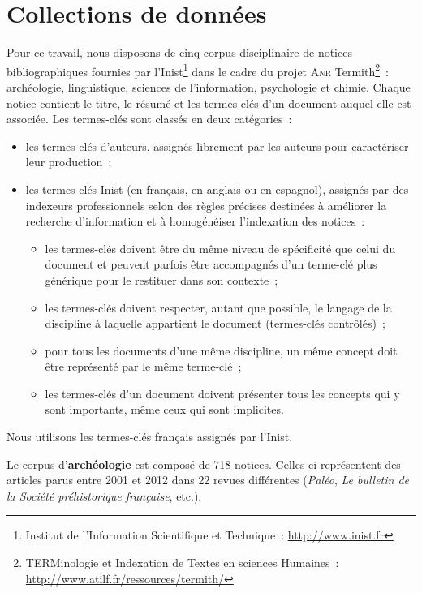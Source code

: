 \section{Collections de données}
\label{sec:presentation_des_donnees}
  Pour ce travail, nous disposons de cinq corpus disciplinaire de notices
  bibliographiques fournies par l'Inist\footnote{Institut de l'Information
  Scientifique et Technique~: \url{http://www.inist.fr}} dans le cadre du projet
  \textsc{Anr} Termith\footnote{TERMinologie et Indexation de Textes en sciences
  Humaines~: \url{http://www.atilf.fr/ressources/termith/}}~: archéologie,
  linguistique, sciences de l'information, psychologie et chimie. Chaque notice
  contient le titre, le résumé et les termes-clés d'un document auquel elle est
  associée. Les termes-clés sont classés en deux catégories~:
  \begin{itemize}
    \item{les termes-clés d'auteurs, assignés librement par les auteurs pour
          caractériser leur production~;}
    \item{les termes-clés Inist (en français, en anglais ou en espagnol),
          assignés par des indexeurs professionnels selon des règles précises
          destinées à améliorer la recherche d'information et à homogénéiser
          l'indexation des notices~:}
    \begin{itemize}
      \item{les termes-clés doivent être du même niveau de spécificité que celui
            du document et peuvent parfois être accompagnés d'un terme-clé plus
            générique pour le restituer dans son contexte~;}
      \item{les termes-clés doivent respecter, autant que possible, le langage
            de la discipline à laquelle appartient le document (termes-clés
            contrôlés)~;}
      \item{pour tous les documents d'une même discipline, un même concept doit
            être représenté par le même terme-clé~;}
      \item{les termes-clés d'un document doivent présenter tous les concepts
            qui y sont importants, même ceux qui sont implicites.}
    \end{itemize}
  \end{itemize}
  Nous utilisons les termes-clés français assignés par l'Inist.

  Le corpus d'\textbf{archéologie} est composé de 718 notices. Celles-ci
  représentent des articles parus entre 2001 et 2012 dans 22 revues différentes
  (\textit{Paléo}, \textit{Le bulletin de la Société préhistorique française},
  etc.).

